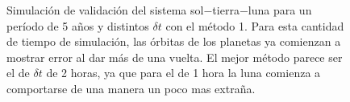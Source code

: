 \begin{figure}
{	\label{fig:ej1_m1_1825_12}
	}
	\caption{
		Simulación de validación del sistema sol$-$tierra$-$luna para un período de 5 años y distintos $\delta t$
		con el método 1.
		Para esta cantidad de tiempo de simulación, las órbitas de los planetas ya comienzan a mostrar error al dar más de una vuelta.
		El mejor método parece ser el de $\delta t$ de 2 horas, ya que para el de 1 hora la luna comienza a comportarse de una manera un poco mas extraña.
	}
	\label{ fig:res_ej1_m1_1825 }
\end{figure}

